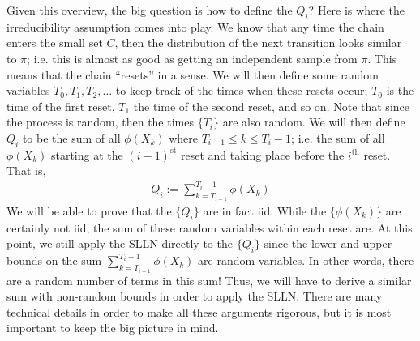 \documentclass[12pt]{article}
\begin{document}
Given this overview, the big question is how to define the $Q_i$? Here is where the irreducibility assumption comes into play. We know that any time the chain enters the small set $C$, then the 
distribution of the next transition looks similar to $\pi$; i.e. this is almost as good as getting an independent sample from $\pi$. This means that the chain ``resets'' in a sense. We will then define 
some random variables $T_0, T_1, T_2, \dots$ to keep track of the times when these resets occur; $T_0$ is the time of the first reset, $T_1$ the time of the second reset, and so on. Note that 
since the process is random, then the times $\{T_i\}$ are also random. We will then define $Q_i$ to be the sum of all $\phi(X_k)$ where $T_{i - 1} \leq k \leq T_i - 1$; i.e. the sum of all 
$\phi(X_k)$ starting at the $(i-1)^{\text{st}}$ reset and taking place before the $i^{\text{th}}$ reset. That is, 
\begin{align*}
Q_i := \sum_{k = T_{i-1}}^{T_i - 1} \phi(X_k)
\end{align*}
We will be able to prove that the $\{Q_i\}$ are in fact iid. While the $\{\phi(X_k)\}$ are certainly not iid, the sum of these random variables within each reset are. At this point, we still 
apply the SLLN directly to the $\{Q_i\}$ since the lower and upper bounds on the sum $ \sum_{k = T_{i-1}}^{T_i - 1} \phi(X_k)$ are random variables. In other words, there are a random 
number of terms in this sum! Thus, we will have to derive a similar sum with non-random bounds in order to apply the SLLN. There are many technical details in order to make all these arguments 
rigorous, but it is most important to keep the big picture in mind. 
\end{document}

